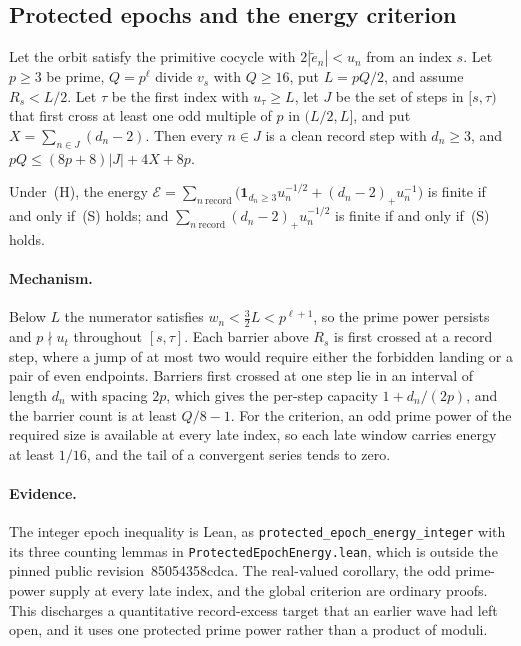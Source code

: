 \documentclass[11pt]{article}
\renewcommand{\commitshort}{85054358cdca}
\begin{document}
\subsection{Protected epochs and the energy criterion}

\begin{theorem}\label{long243:res:epochenergy}
Let the orbit satisfy the primitive cocycle with $2|\tilde e_n|<u_n$ from an
index $s$.  Let $p\ge3$ be prime, $Q=p^{\ell}$ divide $v_s$ with $Q\ge16$, put
$L=pQ/2$, and assume $R_s<L/2$.  Let $\tau$ be the first index with $u_\tau\ge
L$, let $J$ be the set of steps in $[s,\tau)$ that first cross at least one odd
multiple of $p$ in $(L/2,L]$, and put $X=\sum_{n\in J}(d_n-2)$.  Then every
$n\in J$ is a clean record step with $d_n\ge3$, and
$pQ\le(8p+8)\lvert J\rvert+4X+8p$.
\end{theorem}

\begin{theorem}\label{long243:res:energycriterion}
Under~(H), the energy
$\mathcal E=\sum_{n\ \mathrm{record}}\bigl(\mathbf 1_{d_n\ge3}u_n^{-1/2}
+(d_n-2)_+u_n^{-1}\bigr)$ is finite if and only if~(S) holds; and
$\sum_{n\ \mathrm{record}}(d_n-2)_+u_n^{-1/2}$ is finite if and only if~(S)
holds.
\end{theorem}

\paragraph{Mechanism.}
Below $L$ the numerator satisfies $w_n<\tfrac32L<p^{\ell+1}$, so the prime power
persists and $p\nmid u_t$ throughout $[s,\tau]$.  Each barrier above $R_s$ is
first crossed at a record step, where a jump of at most two would require either
the forbidden landing or a pair of even endpoints.  Barriers first crossed at one
step lie in an interval of length $d_n$ with spacing $2p$, which gives the
per-step capacity $1+d_n/(2p)$, and the barrier count is at least $Q/8-1$.  For
the criterion, an odd prime power of the required size is available at every late
index, so each late window carries energy at least $1/16$, and the tail of a
convergent series tends to zero.

\paragraph{Evidence.}
The integer epoch inequality is Lean, as
\texttt{protected\_epoch\_energy\_integer} with its three counting lemmas in
\texttt{ProtectedEpochEnergy.lean}, which is outside the pinned public
revision~\commitshort.  The real-valued corollary, the odd prime-power supply at
every late index, and the global criterion are ordinary proofs.  This discharges
a quantitative record-excess target that an earlier wave had left open, and it
uses one protected prime power rather than a product of moduli.
\end{document}
